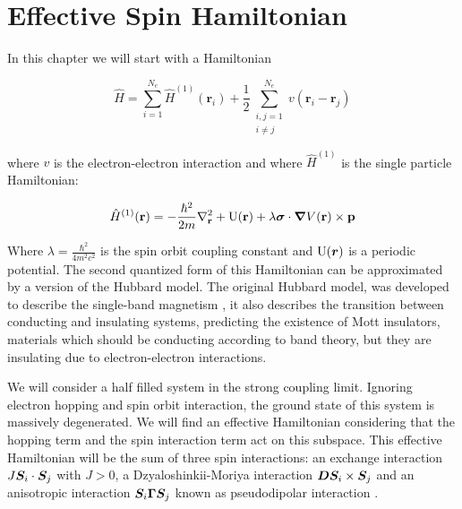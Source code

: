 \chapter{Effective Spin Hamiltonian}
\label{ChapEffectiveSpin}

In this chapter we will start with a Hamiltonian

\begin{equation}
\label{Ham1}
\hat{H} = \sum_{i=1}^{N_e} \hat{H}^{(1)}(\textbf{r}_i) + \frac{1}{2} \sum_{\substack{i,j = 1 \\ i \neq j}} ^ {N_e} v(\textbf{r}_i - \textbf{r}_j)
\end{equation}

where $v$ is the electron-electron interaction and where $\hat{H}^{(1)}$ is the single particle Hamiltonian:

\begin{equation}
\hat{H}^{(1)}(\textbf{r}) = -\frac{\hbar^2}{2m}\nabla^2_{\textbf{r}} + \text{U}(\textbf{r}) + \lambda\boldsymbol{\sigma}\cdot\boldsymbol{\nabla}V(\textbf{r}) \times \textbf{p}
\end{equation}

Where $\lambda = \frac{\hbar^2}{4m^2c^2}$ is the spin orbit coupling constant and $\text{U}(\boldsymbol{r})$ is a periodic potential. The second quantized form of this Hamiltonian can be approximated by a version of the Hubbard model. The original Hubbard model, was developed to describe the single-band magnetism \cite{Hubbard1963}, it also describes the transition between conducting and insulating systems, predicting the existence of Mott insulators, materials which should be conducting according to band theory, but they are insulating due to electron-electron interactions.

We will consider a half filled system in the strong coupling limit. Ignoring electron hopping and spin orbit interaction, the ground state of this system is massively degenerated. We will find an effective Hamiltonian considering that the hopping term and the spin interaction term act on this subspace. This effective Hamiltonian will be the sum of three spin interactions: an exchange interaction $J\boldsymbol{S}_i\cdot\boldsymbol{S}_j$ with $J>0$, a Dzyaloshinkii-Moriya interaction $\boldsymbol{D}\boldsymbol{S}_i\times\boldsymbol{S}_j$ and an anisotropic interaction $\boldsymbol{S}_i \boldsymbol{\Gamma} \boldsymbol{S}_j$ known as pseudodipolar interaction \cite{Moriya1960}.


